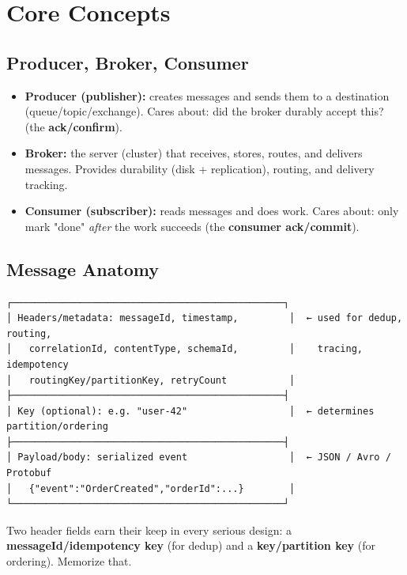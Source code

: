 \documentclass[11pt]{article}
\providecommand{\tightlist}{\setlength{\itemsep}{1pt}\setlength{\parskip}{0pt}}
\begin{document}
\section{Core Concepts}\label{core-concepts}

\subsection{Producer, Broker, Consumer}\label{producer-broker-consumer}

\begin{itemize}
\tightlist
\item
  \textbf{Producer (publisher):} creates messages and sends them to a destination (queue/topic/exchange). Cares about: did the broker durably accept this? (the \textbf{ack/confirm}).
\item
  \textbf{Broker:} the server (cluster) that receives, stores, routes, and delivers messages. Provides durability (disk + replication), routing, and delivery tracking.
\item
  \textbf{Consumer (subscriber):} reads messages and does work. Cares about: only mark "done" \emph{after} the work succeeds (the \textbf{consumer ack/commit}).
\end{itemize}

\subsection{Message Anatomy}\label{message-anatomy}

\setcodelang{}

\begin{verbatim}
┌────────────────────────────────────────────────┐
│ Headers/metadata: messageId, timestamp,         │  ← used for dedup, routing,
│   correlationId, contentType, schemaId,         │    tracing, idempotency
│   routingKey/partitionKey, retryCount           │
├────────────────────────────────────────────────┤
│ Key (optional): e.g. "user-42"                  │  ← determines partition/ordering
├────────────────────────────────────────────────┤
│ Payload/body: serialized event                  │  ← JSON / Avro / Protobuf
│   {"event":"OrderCreated","orderId":...}        │
└────────────────────────────────────────────────┘
\end{verbatim}

Two header fields earn their keep in every serious design: a \textbf{messageId/idempotency key} (for dedup) and a \textbf{key/partition key} (for ordering). Memorize that.
\end{document}
